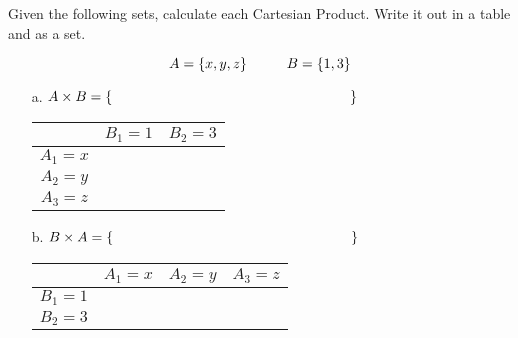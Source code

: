 \documentclass[a4paper,12pt]{book}
\newcounter{question}
\begin{document}
        
        \begin{questionNOGRADE}{\thequestion}

            Given the following sets, calculate each Cartesian Product.
            Write it out in a table and as a set.

            $$ A = \{x, y, z\} \hspace*{1cm} B = \{1, 3\} $$

            \begin{enumerate}
                \item[a.] $A \times B = \{ \tab[6cm] \}$
                    \begin{center}
                        \begin{tabular}{c | c | c}
                            & $B_{1} = 1$ & $B_{2} = 3$ \\ \hline
                            $A_{1} = x$ & & \\
                            $A_{2} = y$ & & \\
                            $A_{3} = z$ & & 
                        \end{tabular}
                    \end{center}

                
                \item[b.] $B \times A = \{ \tab[6cm] \}$
                    \begin{center}
                        \begin{tabular}{c | c | c | c}
                            & $A_{1} = x$ & $A_{2} = y$ & $A_{3} = z$ \\ \hline
                            $B_{1} = 1$ & & & \\
                            $B_{2} = 3$ & & &
                        \end{tabular}
                    \end{center}

            \end{enumerate}

        \end{questionNOGRADE}

        \hrulefill
\end{document}
